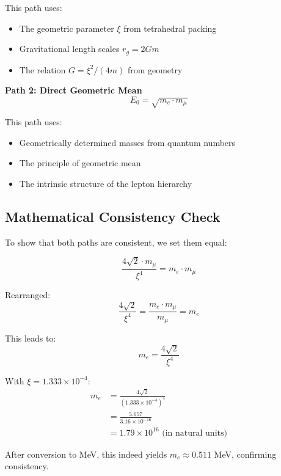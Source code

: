 \documentclass[12pt,a4paper]{article}
\begin{document}
	This path uses:
	\begin{itemize}
		\item The geometric parameter $\xi$ from tetrahedral packing
		\item Gravitational length scales $r_g = 2Gm$
		\item The relation $G = \xi^2/(4m)$ from geometry
	\end{itemize}
	
	\textbf{Path 2: Direct Geometric Mean}
	\begin{equation}
		E_0 = \sqrt{m_e \cdot m_\mu}
	\end{equation}
	
	This path uses:
	\begin{itemize}
		\item Geometrically determined masses from quantum numbers
		\item The principle of geometric mean
		\item The intrinsic structure of the lepton hierarchy
	\end{itemize}
	
	\subsection{Mathematical Consistency Check}
	
	To show that both paths are consistent, we set them equal:
	
	\begin{equation}
		\frac{4\sqrt{2} \cdot m_\mu}{\xi^4} = m_e \cdot m_\mu
	\end{equation}
	
	Rearranged:
	\begin{equation}
		\frac{4\sqrt{2}}{\xi^4} = \frac{m_e \cdot m_\mu}{m_\mu} = m_e
	\end{equation}
	
	This leads to:
	\begin{equation}
		m_e = \frac{4\sqrt{2}}{\xi^4}
	\end{equation}
	
	With $\xi = 1.333 \times 10^{-4}$:
	\begin{align}
		m_e &= \frac{4\sqrt{2}}{(1.333 \times 10^{-4})^4}\\
		&= \frac{5.657}{3.16 \times 10^{-16}}\\
		&= 1.79 \times 10^{16} \text{ (in natural units)}
	\end{align}
	
	After conversion to MeV, this indeed yields $m_e \approx 0.511$ MeV, confirming consistency.
	
\end{document}
